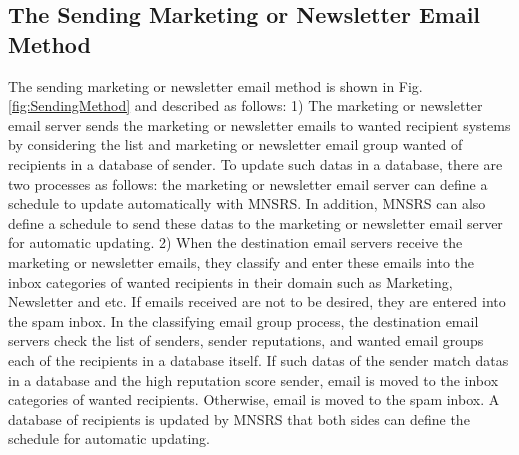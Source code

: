 \documentclass[conference]{IEEEtran}
\begin{document}
\subsection{The Sending Marketing or Newsletter Email Method}
\label{subsec:3}
The sending marketing or newsletter email method is
shown in Fig. \ref{fig:SendingMethod} and described as follows:
1) The marketing or newsletter email server sends the marketing or newsletter emails to wanted recipient systems by considering the list and marketing or newsletter email group wanted of recipients in a database of sender.  
To update such datas in a database, there are two processes as follows: the marketing or newsletter email server can define a schedule to update automatically with MNSRS.
In addition, MNSRS can also define a schedule to send these datas to the marketing or newsletter email server for automatic updating. 
2) When the destination email servers receive the marketing or newsletter emails, they classify and enter these emails into the inbox categories of wanted recipients in their domain such as Marketing, Newsletter and etc. 
If emails received are not to be desired, they are entered into the spam inbox.
%
In the classifying email group process, the destination email servers check
the list of senders, sender reputations, and wanted email groups each of the recipients in a database itself.
%
If such datas of the sender match datas in a database and the high reputation score sender, email is moved to the inbox categories of wanted recipients.
Otherwise, email is moved to the spam inbox.
A database of recipients is updated by MNSRS that both sides can define the schedule for automatic updating.

\end{document}
